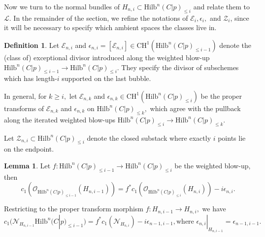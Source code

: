 \documentclass[10.5pt]{amsart}
\theoremstyle{definition}
\theoremstyle{definition}
\theoremstyle{definition}
\theoremstyle{definition}
\newtheorem{lemma}[theorem]{Lemma}
\newtheorem{definition}[theorem]{Definition}
\newcommand{\Hilb}{\mathrm{Hilb}}
\newcommand{\cZ}{\mathcal{Z}}
\newcommand{\cE}{\mathcal{E}}
\newcommand{\V}[1]{{\color{orange2} #1}}
\begin{document}
Now we turn to the normal bundles of $H_{n,i}\subset \Hilb^n(C|p)_{\leq i}$ and relate them to $\mathcal{L}.$ In the remainder of the section, we refine the notations of $\cE_i, \epsilon_i,$ and $\cZ_i$, since it will be necessary to specify which ambient spaces the classes live in.

\begin{definition}\label{def: doubleindexes}
     Let $\cE_{n,i}$ and $\epsilon_{n,i}=[\cE_{n,i}]\in \mathrm{CH}^1(\Hilb^n(C|p)_{\leq i-1})$ denote the (class of) exceptional divisor introduced along the weighted blow-up $\Hilb^n(C|p)_{\leq i-1}\to \Hilb^n(C|p)_{\leq i}.$ They specify the divisor of subschemes which has length-$i$ supported on the last bubble. 
    
    In general, for $k \geq i,$ let $\cE_{n,k}$ and $\epsilon_{n,k}\in \mathrm{CH}^1(\Hilb^n(C|p)_{\leq i})$ be the proper transforms of $\cE_{n,k}$ and $\epsilon_{n,k}$ on $\Hilb^n(C|p)_{\leq k},$ which agree with the pullback along the iterated weighted blow-ups $\Hilb^n(C|p)_{\leq i}\to \Hilb^n(C|p)_{\leq k}.$

    Let $\mathcal{Z}_{n,i}\subset \Hilb^{n}(C|p)_{\leq i}$ denote the closed substack where exactly $i$ points lie on the endpoint.
\end{definition}

\begin{lemma}\label{lem:blwoupnormal}
  Let $f: \Hilb^n(C|p)_{\leq i-1}\to \Hilb^n(C|p)_{\leq i}$ be the weighted blow-up, then %
$${c_1(\mathcal{O}_{\Hilb^n(C|p)_{\leq i-1}}(H_{n,i-1})) = f^* c_1(\mathcal{O}_{\Hilb^n(C|p)_{\leq i}}(H_{n,{i}}))-i\epsilon_{n,i}}.$$
  
  Restricting to the proper transform morphism $f: H_{n,i-1}\to H_{n,i},$ we have %
  \begin{equation}\label{eqn:NHni}{c_1(\mathcal{N}_{H_{n,i-1}} \Hilb^n(C|p)_{\leq i-1}) = f^* c_1(\mathcal{N}_{H_{n,i}})-i\epsilon_{ n-1, i-1}, \text{where }\epsilon_{n,i}|_{H_{n,i-1}} = \epsilon_{n-1, i-1}.}\end{equation}
  
  
\end{lemma}
\end{document}

